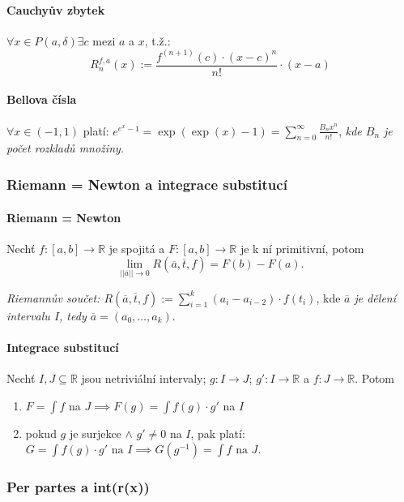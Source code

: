\documentclass[10pt,a4paper]{article}
\newcommand{\R}{{\mathbb{R}}}
\begin{document}
\paragraph*{Cauchyův zbytek} $\forall x \in P(a, \delta) \exists c$ mezi $a$ a $x$, t.ž.:
\[
   R_n^{f,a}(x):=\frac{f^{(n+1)}(c)\cdot (x-c)^n}{n!}\cdot (x-a)
\]

\paragraph*{Bellova čísla} $\forall x \in (-1, 1)$ platí: $\displaystyle e^{e^x-1} = \exp(\exp(x)-1) = \sum_{n=0}^{\infty}\frac{B_n x^n}{n!}$, \textit{kde $B_n$ je počet rozkladů množiny.}

\subsubsection{Riemann = Newton a integrace substitucí}

\paragraph*{Riemann = Newton} Nechť $f:[a,b]\to \R$ je spojitá a $F:[a,b]\to \R$ je k ní primitivní, potom
\[
    \lim_{||\overline{a}||\to 0}R(\overline{a}, \overline{t}, f) = F(b) - F(a).
\]

\textit{Riemannův součet: $R(\overline{a}, \overline{t}, f):= \displaystyle \sum_{i = 1}^{k}(a_i - a_{i-2})\cdot f(t_i)$}, 
kde \textit{$\overline{a}$ je dělení intervalu $I$, tedy $\overline{a} = (a_0, \dots, a_k)$}.

\paragraph*{Integrace substitucí} Nechť $I, J \subseteq \R$ jsou netriviální intervaly; $g: I\to J$; $g': I\to \R$ a $f:J\to \R$. Potom
\begin{enumerate}
    \item $\displaystyle F = \int f$ na $\displaystyle J \implies F(g) = \int f(g) \cdot g'$ na $I$
    \item pokud $g$ je surjekce $\land$ $g' \neq 0$ na $I$, pak platí: $\displaystyle G = \int f(g)\cdot g' \text{ na } I \implies G(g^{-1}) = \int f \text{ na } J$.
\end{enumerate}

\subsubsection{Per partes a int(r(x))}
\end{document}

